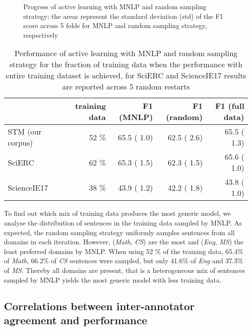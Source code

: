 \documentclass[runningheads]{llncs}
\begin{document}
\begin{figure}[htb]
    \caption{Progress of active learning with MNLP and random sampling strategy; the areas represent the standard deviation (std) of the F1 score across 5 folds for MNLP and random sampling strategy, respectively}
    \label{fig:al_sen_based}    
\end{figure}

\begin{table}[htb]
\caption{Performance of active learning with MNLP and random sampling strategy for the fraction of training data when the performance with entire training dataset is achieved, for SciERC and ScienceIE17 results are reported across 5 random restarts}
\begin{tabular}{l|rrrr}
& \multicolumn{1}{p{20mm}}{training data} & \multicolumn{1}{p{20mm}}{F1 (MNLP)}        & \multicolumn{1}{p{20mm}}{F1 (random)}        & \multicolumn{1}{p{20mm}}{F1 (full data)}    \\ \hline
STM (our corpus)         & 52 \%                    & 65.5 ( 1.0) & 62.5 ( 2.6) & 65.5 ( 1.3) \\
SciERC~\cite{Luan2018MultiTaskIO}      & 62 \%                   & 65.3 ( 1.5) & 62.3 ( 1.5) & 65.6 ( 1.0) \\
ScienceIE17~\cite{augenstein2017semeval} & 38 \%                   & 43.9 ( 1.2) & 42.2 ( 1.8) & 43.8 ( 1.0)
\end{tabular}
\label{table:al_results}
\end{table}


To find out which mix of training data produces the most generic model, we analyse the distribution of sentences in the training data sampled by MNLP. 
As expected, the random sampling strategy uniformly samples sentences from all domains in each iteration.
However, (\textit{Math}, \textit{CS}) are the most and (\textit{Eng}, \textit{MS}) the least preferred domains by MNLP. 
When using 52 \% of the training data, 65.4\% of \textit{Math}, 66.2\% of \textit{CS} sentences were sampled, but only 41.6\% of \textit{Eng} and 37.3\% of \textit{MS}. Thereby all domains are present, that is a heterogeneous mix of sentences sampled by MNLP yields the most generic model with less training data.



\subsection{Correlations between inter-annotator agreement and performance}
\end{document}
